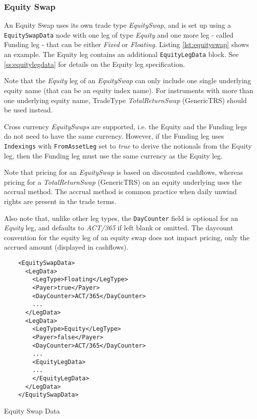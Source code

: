 \subsubsection{Equity Swap}
\label{ss:equity_swap}

An Equity Swap uses its own trade type  \emph{EquitySwap}, and is set up using a {\tt EquitySwapData} node with one leg of type  \emph{Equity} and one more leg - called Funding leg -  that can be either \emph{Fixed} or  \emph{Floating}. Listing \ref{lst:equityswap} shows an example. The
Equity leg contains an additional {\tt EquityLegData} block. See \ref{ss:equitylegdata} for details on the Equity leg specification.

Note that the  \emph{Equity} leg of an \emph{EquitySwap} can only include one single underlying equity name (that can be an equity index name). For instruments with more than one underlying equity name, TradeType \emph{TotalReturnSwap} (GenericTRS) should be used instead.

Cross currency \emph{EquitySwaps} are supported, i.e. the Equity and the Funding legs do not need to have the same currency. However, if the Funding leg uses \lstinline!Indexings! with \lstinline!FromAssetLeg! 
 set to \emph{true} to derive the notionals from the Equity leg, then the Funding leg must use the same currency as the Equity leg.
 
Note that pricing for an \emph{EquitySwap} is based on discounted cashflows, whereas pricing for a \emph{TotalReturnSwap} (GenericTRS) on an equity underlying uses the accrual method. The accrual method is common practice when daily unwind rights are present in the trade terms.


Also note that, unlike other leg types, the {\tt DayCounter} field is optional for an \emph{Equity} leg, and defaults to \emph{ACT/365} if left blank or omitted. The daycount convention for the equity leg of an equity swap does not impact pricing, only the accrued amount (displayed in cashflows).


\begin{listing}[H]
\begin{verbatim}
    <EquitySwapData>
      <LegData>
        <LegType>Floating</LegType>
        <Payer>true</Payer>
        <DayCounter>ACT/365</DayCounter>
        ...
      </LegData>
      <LegData>
        <LegType>Equity</LegType>
        <Payer>false</Payer>
        <DayCounter>ACT/365</DayCounter>
        ...
        <EquityLegData>
        ...
        </EquityLegData>
      </LegData>
    </EquitySwapData>
\end{verbatim}
\caption{Equity Swap Data}
\label{lst:equityswap}
\end{listing}

